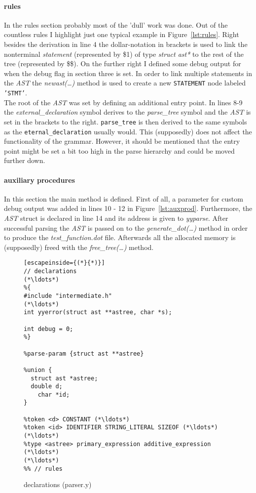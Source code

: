 \documentclass{scrartcl}
\begin{document}
\paragraph*{rules}  In the rules section probably most of the 'dull' work was done. Out of the countless rules I highlight just one typical example in Figure~\ref{lst:rules}. Right besides the derivation in line 4 the dollar-notation in brackets is used to link the nonterminal \textit{statement} (represented by \$1) of type \textit{struct ast*} to the rest of the tree (represented by \$\$). On the further right I defined some debug output for when the debug flag in section three is set. In order to link multiple statements in the \textit{AST} the \textit{newast(\ldots)} method is used to create a new \texttt{STATEMENT} node labeled \texttt{'STMT'}.\\
The root of the \textit{AST} was set by defining an additional entry point. In lines 8-9 the \textit{external\_declaration} symbol derives to the \textit{parse\_tree} symbol and the \textit{AST} is set in the brackets to the right. \texttt{parse\_tree} is then derived to the same symbols as the \texttt{eternal\_declaration} usually would. This (supposedly) does not affect the functionality of the grammar. However, it should be mentioned that the entry point might be set a bit too high in the parse hierarchy and could be moved further down.

\paragraph*{auxiliary procedures} In this section the main method is defined. First of all, a parameter for custom debug output was added in lines 10 - 12 in Figure~\ref{lst:auxprod}. Furthermore, the \textit{AST} struct is declared in line 14 and its address is given to \textit{yyparse}. After successful parsing the \textit{AST} is passed on to the \textit{generate\_dot(\ldots)} method in order to produce the \textit{test\_function.dot} file. Afterwards all the allocated memory is (supposedly) freed with the \textit{free\_tree(\ldots)} method.

\begin{figure}[H]
\begin{lstlisting}[escapeinside={(*}{*)}]
// declarations
(*\ldots*)
%{
#include "intermediate.h"
(*\ldots*)
int yyerror(struct ast **astree, char *s);

int debug = 0;
%}

%parse-param {struct ast **astree}

%union {
  struct ast *astree;
  double d;
	char *id;
}

%token <d> CONSTANT (*\ldots*)
%token <id> IDENTIFIER STRING_LITERAL SIZEOF (*\ldots*)
(*\ldots*)
%type <astree> primary_expression additive_expression (*\ldots*)
(*\ldots*)
%% // rules
\end{lstlisting}
\caption{declarations (parser.y)}
\label{lst:declarations}
\end{figure}
\end{document}
